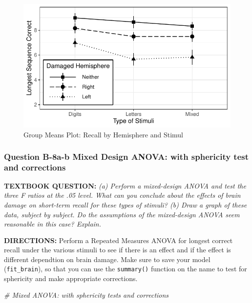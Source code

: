 \documentclass[
]{article}
\newenvironment{Shaded}{\begin{snugshade}}{\end{snugshade}}
\newcommand{\CommentTok}[1]{\textcolor[rgb]{0.56,0.35,0.01}{\textit{#1}}}
\begin{document}
\begin{figure}

{\centering \includegraphics{Chapter-16-Assignment-R-Skeleton_files/figure-latex/unnamed-chunk-24-1} 

}

\caption{Group Means Plot: Recall by Hemisphere and Stimul}\label{fig:unnamed-chunk-24}
\end{figure}

\clearpage

\hypertarget{question-b-8a-b-mixed-design-anova-with-sphericity-test-and-corrections}{%
\subsubsection{Question B-8a-b Mixed Design ANOVA: with sphericity test
and
corrections}\label{question-b-8a-b-mixed-design-anova-with-sphericity-test-and-corrections}}

\textbf{TEXTBOOK QUESTION:} \emph{(a) Perform a mixed-design ANOVA and
test the three F ratios at the .05 level. What can you conclude about
the effects of brain damage on short-term recall for these types of
stimuli? (b) Draw a graph of these data, subject by subject. Do the
assumptions of the mixed-design ANOVA seem reasonable in this case?
Explain. }

\textbf{DIRECTIONS:} Perform a Repeated Measures ANOVA for longest
correct recall under the various stimuli to see if there is an effect
and if the effect is different dependtion on brain damage. Make sure to
save your model (\texttt{fit\_brain}), so that you can use the
\texttt{summary()} function on the name to test for sphericity and make
appropriate corrections.

\begin{Shaded}
\begin{Highlighting}[]
\CommentTok{# Mixed ANOVA:  with sphericity tests and corrections}
\end{Highlighting}
\end{Shaded}
\end{document}
